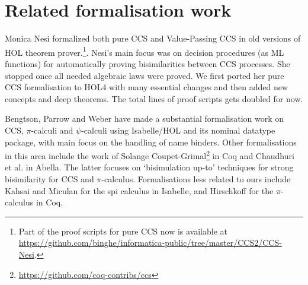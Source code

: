 \section{Related formalisation work}
\label{s:rel}

Monica Nesi formalized both pure CCS \cite{Nesi:1992ve} and Value-Passing CCS
\cite{Nesi:2017wo} in old versions of HOL theorem prover.\footnote{Part of
 the proof scripts for pure CCS now is available at \url{https://github.com/binghe/informatica-public/tree/master/CCS2/CCS-Nesi}.}.
Nesi's main focus was on
 decision procedures (as ML functions) for
automatically proving bisimilarities between CCS
processes. She stopped once all needed algebraic laws were proved. We
first ported her pure CCS formalisation to HOL4 with many essential
changes and then added new concepts and deep theorems. The total lines of
proof scripts gets doubled for now.

Bengtson,  Parrow and Weber
have made a substantial formalisation work 
on CCS, $\pi$-calculi
\cite{bengtson2010formalising,bengtson2007formalising,bengtson2007completeness}
and $\psi$-calculi 
using Isabelle/HOL and its nominal datatype package, with main focus on the handling of name binders.
%
Other formalisations in this area include the work of Solange
Coupet-Grimal\footnote{\url{https://github.com/coq-contribs/ccs}} in Coq
and Chaudhuri et al.\;\cite{chaudhuri2015lightweight} in Abella. The
latter focuses on `bisimulation up-to' techniques for strong bisimilarity 
for CCS and $\pi$-calculus.
Formalisations less related to ours
include Kahsai and Miculan \cite{kahsai2008implementing} for the spi
calculus  in Isabelle, and Hirschkoff \cite{hirschkoff1997full} for the $\pi$-calculus in Coq.


